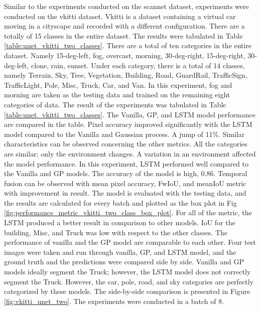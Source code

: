 	Similar to the experiments conducted on the scannet dataset, experiments were conducted on the vkitti dataset. Vkitti is a dataset containing a virtual car moving in a cityscape and recorded with a different configuration. There are a totally of 15 classes in the entire dataset. The results were tabulated in Table \ref{table:unet_vkitti_two_classes}. There are a total of ten categories in the entire dataset. Namely 15-deg-left, fog, overcast, morning, 30-deg-right, 15-deg-right, 30-deg-left, clone, rain, sunset. Under each category, there is a total of 14 classes, namely Terrain, Sky, Tree, Vegetation, Building, Road, GuardRail, TrafficSign, TrafficLight, Pole, Misc, Truck, Car, and Van. In this experiment, fog and morning are taken as the testing data and trained on the remaining eight categories of data.
	The result of the experiments was tabulated in Table \ref{table:unet_vkitti_two_classes}. The Vanilla, GP, and LSTM model performance are compared in the table. Pixel accuracy improved significantly with the LSTM model compared to the Vanilla and Gaussian process. A jump of 11\%. Similar characteristics can be observed concerning the other metrics. All the categories are similar; only the environment changes. A variation in an environment affected the model performance. In this experiment, LSTM performed well compared to the Vanilla and GP models. The accuracy of the model is high, 0.86. Temporal fusion can be observed with mean pixel accuracy, FwIoU, and meanIoU metric with improvement in result. The model is evaluated with the testing data, and the results are calculated for every batch and plotted as the box plot in Fig \ref{fig:performance_metric_vkitti_two_class_box_plot}. For all of the metric, the LSTM produced a better result in comparison to other models. IoU for the building, Misc, and Truck was low with respect to the other classes. The performance of vanilla and the GP model are comparable to each other. Four test images were taken and run through vanilla, GP, and LSTM model, and the ground truth and the predictions were compared side by side. Vanilla and GP models ideally segment the Truck; however, the LSTM model does not correctly segment the Truck. However, the car, pole, road, and sky categories are perfectly categorized by these models. The side-by-side comparison is presented in Figure \ref{fig:vkitti_unet_two}. The experiments were conducted in a batch of 8.
	
